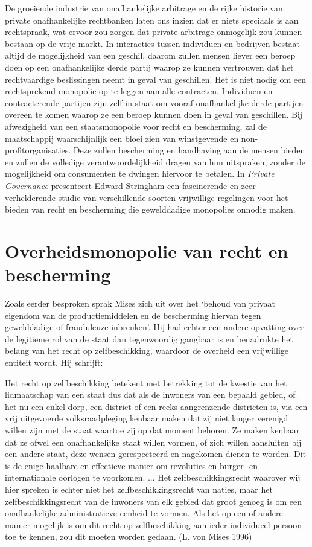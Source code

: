 \documentclass[
  a5paper,
  smalldemyvopaper,11pt,twoside,onecolumn,openright,extrafontsizes,
hidelinks]{memoir}
\begin{document}
De groeiende industrie van onafhankelijke arbitrage en de rijke historie
van private onafhankelijke rechtbanken laten ons inzien dat er niets
speciaals is aan rechtspraak, wat ervoor zou zorgen dat private
arbitrage onmogelijk zou kunnen bestaan op de vrije markt. In
interacties tussen individuen en bedrijven bestaat altijd de
mogelijkheid van een geschil, daarom zullen mensen liever een beroep
doen op een onafhankelijke derde partij waarop ze kunnen vertrouwen dat
het rechtvaardige beslissingen neemt in geval van geschillen. Het is
niet nodig om een rechtsprekend monopolie op te leggen aan alle
contracten. Individuen en contracterende partijen zijn zelf in staat om
vooraf onafhankelijke derde partijen overeen te komen waarop ze een
beroep kunnen doen in geval van geschillen. Bij afwezigheid van een
staatsmonopolie voor recht en bescherming, zal de maatschappij
waarschijnlijk een bloei zien van winstgevende en
non-profitorganisaties. Deze zullen bescherming en handhaving aan de
mensen bieden en zullen de volledige verantwoordelijkheid dragen van hun
uitspraken, zonder de mogelijkheid om consumenten te dwingen hiervoor te
betalen. In \emph{Private Governance} presenteert Edward Stringham een
fascinerende en zeer verhelderende studie van verschillende soorten
vrijwillige regelingen voor het bieden van recht en bescherming die
gewelddadige monopolies onnodig maken.

\section{Overheidsmonopolie van recht en
bescherming}\label{overheidsmonopolie-van-recht-en-bescherming}

Zoals eerder besproken sprak Mises zich uit over het `behoud van privaat
eigendom van de productiemiddelen en de bescherming hiervan tegen
gewelddadige of frauduleuze inbreuken'. Hij had echter een andere
opvatting over de legitieme rol van de staat dan tegenwoordig gangbaar
is en benadrukte het belang van het recht op zelfbeschikking, waardoor
de overheid een vrijwillige entiteit wordt. Hij schrijft:

Het recht op zelfbeschikking betekent met betrekking tot de kwestie van
het lidmaatschap van een staat dus dat als de inwoners van een bepaald
gebied, of het nu een enkel dorp, een district of een reeks aangrenzende
districten is, via een vrij uitgevoerde volksraadpleging kenbaar maken
dat zij niet langer verenigd willen zijn met de staat waartoe zij op dat
moment behoren. Ze maken kenbaar dat ze ofwel een onafhankelijke staat
willen vormen, of zich willen aansluiten bij een andere staat, deze
wensen gerespecteerd en nagekomen dienen te worden. Dit is de enige
haalbare en effectieve manier om revoluties en burger- en internationale
oorlogen te voorkomen. ... Het zelfbeschikkingsrecht waarover wij hier
spreken is echter niet het zelfbeschikkingsrecht van naties, maar het
zelfbeschikkingsrecht van de inwoners van elk gebied dat groot genoeg is
om een onafhankelijke administratieve eenheid te vormen. Als het op een
of andere manier mogelijk is om dit recht op zelfbeschikking aan ieder
individueel persoon toe te kennen, zou dit moeten worden gedaan. (L. von
Mises 1996)
\end{document}

